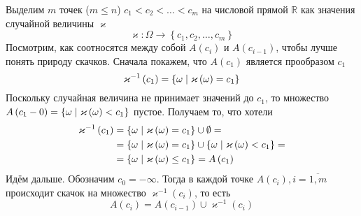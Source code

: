 Выделим $m$ точек ($m \le n$) $c_1<c_2<\dots<c_m$
на числовой прямой $\mathbb{R}$ как значения случайной величины $\varkappa$
$$\varkappa: \Omega \rightarrow \left\{ c_1, c_2, \dots, c_m \right\}$$
Посмотрим, как соотносятся между собой
$A\left( c_i \right)$ и $A\left( c_{i-1} \right)$,
чтобы лучше понять природу скачков.
Сначала покажем, что $A\left( c_1 \right)$ является прообразом $c_1$
$$\varkappa^{-1}\left( c_1 \right)
  = \left\{ \omega \;\middle|\; \varkappa\left( \omega \right) = c_1 \right\}$$
Поскольку случайная величина не принимает значений до $c_1$,
то множество $A\left( c_1-0 \right)
= \left\{ \omega \;\middle|\; \varkappa\left( \omega \right) < c_1 \right\}$ пустое.
Получаем то, что хотели
\begin{align*}
  \varkappa^{-1}\left( c_1 \right)
      &= \left\{ \omega \;\middle|\; \varkappa\left( \omega \right) = c_1 \right\}
      \cup \emptyset = \\
      &= \left\{ \omega \;\middle|\; \varkappa\left( \omega \right) = c_1 \right\}
      \cup \left\{ \omega
          \;\middle|\; \varkappa\left( \omega \right) < c_1 \right\} = \\
      &= \left\{ \omega \;\middle|\; \varkappa\left( \omega \right) \le c_1 \right\}
      = A\left( c_1 \right)
\end{align*}
Идём дальше. Обозначим $c_0 = -\infty$.
Тогда в каждой точке $A\left( c_i \right), i = \overline{1,m}$
происходит скачок на множество $\varkappa^{-1}\left( c_i \right)$, то есть 
$$A\left( c_i \right)
  = A\left( c_{i-1} \right) \cup \varkappa^{-1}\left( c_i \right)$$
